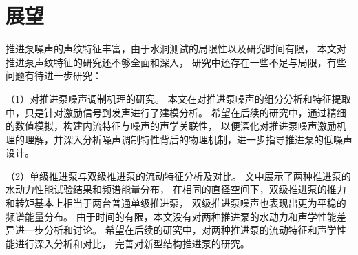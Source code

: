 \begin{comment}
本文的主要创新点如下：

（1）基于 LabVIEW 设计了推进泵噪声测试与分析系统。
该系统支持同步对多通道传感器信号实时采集，各通道信号同时分析、显示及存储，具有操作简单、经济高
效等优势。基于系统的信号分析模块，可实现对推进泵噪声的频段能量分布特点、特征
频段总声压量级、频谱特征等声纹特征分析。


（1）在大型空泡水洞对单级推进泵和双级推进泵开展了噪声试验研究。
在考虑背景噪声影响的基础上，
研究不同工况下推进泵噪声的声纹特征变化，
以及流速等与噪声的声学关联性。
结果表明，中低频段噪声对推进泵噪声有显著贡献。
噪声中低频段、高频段和全频段的总声压级随着流速的增大而增大，
流速变化对推进泵噪声高频段的能量分布和总声压级影响较小，
对中低频段的能量分布和总声压级影响更加明显。

（2）基于循环平稳分析方法实现了推进泵特征线谱的提取，同时对推进泵噪声的调制特性进行了研究。
为了验证循环平稳分析方法提取特征线谱的可行性，
采用CFD数值模拟获得了推进泵脉动力特征，
结果表明循环平稳分析方法提取出的低频线谱成分可以和非定常脉动力的特征线谱对应起来。
推进泵声信号具有强烈的调制特征，其中轴频和动叶叶频的为主要的调制频率。
随着流速的增大，动叶叶频的调制贡献度也愈发显著。
\end{comment}
\section{展望}
推进泵噪声的声纹特征丰富，由于水洞测试的局限性以及研究时间有限，
本文对推进泵声纹特征的研究还不够全面和深入，
研究中还存在一些不足与局限，有些问题有待进一步研究：
\begin{comment}
（1）对推进泵低频线谱噪声的试验研究。
由于水洞测试的局限性，会影响推进泵低频噪声幅值量级的可靠性。
因此本文无法探讨线谱噪声的幅值量级等声纹特征，
只是关注不同工况下中低频段总声压级的相对幅值。
希望在后续的研究中，能精确测量推进泵的低频离散线谱值，
更为全面而深入的分析推进泵的声纹特征。
\end{comment}

（1）对推进泵噪声调制机理的研究。
本文在对推进泵噪声的组分分析和特征提取中，只是针对激励信号到发声进行了建模分析。
希望在后续的研究中，通过精细的数值模拟，构建内流特征与噪声的声学关联性，
以便深化对推进泵噪声激励机理的理解，并深入分析噪声调制特性背后的物理机制，进一步指导推进泵的低噪声设计。

（2）单级推进泵与双级推进泵的流动特征分析及对比。
文中展示了两种推进泵的水动力性能试验结果和频谱能量分布，
在相同的直径空间下，双级推进泵的推力和转矩基本上相当于两台普通单级推进泵，
双级推进泵噪声也表现出更为平稳的频谱能量分布。
由于时间的有限，本文没有对两种推进泵的水动力和声学性能差异进一步分析和讨论。
希望在后续的研究中，对两种推进泵的流动特征和声学性能进行深入分析和对比，
完善对新型结构推进泵的研究。

